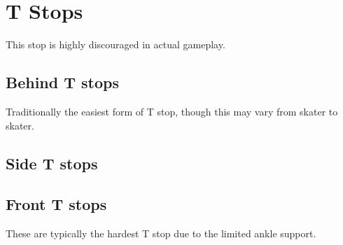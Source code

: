 \section{T Stops}
\label{sec:stopping/t_stops}

This stop is highly discouraged in actual gameplay.

\subsection*{Behind T stops}
Traditionally the easiest form of T stop, though this may vary from skater to skater.


\subsection*{Side T stops}


\subsection*{Front T stops}
These are typically the hardest T stop due to the limited ankle support.


